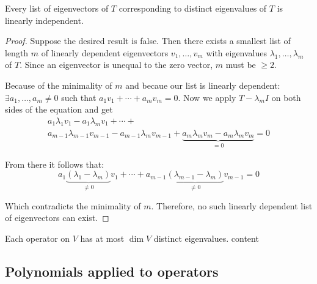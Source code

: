 \setcounter{thm}{10}
\begin{thm}
  Every list of eigenvectors of $T$ corresponding to distinct eigenvalues of $T$ is linearly independent.
\end{thm}
\begin{proof}
  Suppose the desired result is false. Then there exists a smallest list of length $m$ of linearly dependent eigenvectors $v_1, \dots, v_m$ with eigenvalues $\lambda_1, \dots, \lambda_m$ of $T$. Since an eigenvector is unequal to the zero vector, $m$ must be $\geq 2$.

  Because of the minimality of $m$ and becaue our list is linearly dependent: $\exists a_1, \dots, a_m \neq 0$ such that $a_1 v_1 + \cdots + a_m v_m = 0$. Now we apply $T-\lambda_m I$ on both sides of the equation and get
  \begin{equation}
    \begin{gathered}
      a_1 \lambda_1 v_1 - a_1 \lambda_m v_1
      + \cdots + \\
      a_{m-1} \lambda_{m-1} v_{m-1} - a_{m-1} \lambda_{m} v_{m-1} +
      \underbrace{a_m \lambda_m v_m -a_m \lambda_m v_m}_{=0} =0
    \end{gathered}
  \end{equation}

  From there it follows that:
  \begin{equation}
    a_1 \underbrace{(\lambda_1 - \lambda_m)}_{\neq 0} v_1 + \cdots + a_{m-1} \underbrace{(\lambda_{m-1}-\lambda_{m})}_{\neq 0} v_{m-1}=0
  \end{equation}

  Which contradicts the minimality of $m$. Therefore, no such linearly dependent list of eigenvectors can exist.
\end{proof}

\begin{thm}
  Each operator on $V$ has at most $\dim V$ distinct eigenvalues.
  content
\end{thm}

\paragraph{}

\subsection{Polynomials applied to operators}

